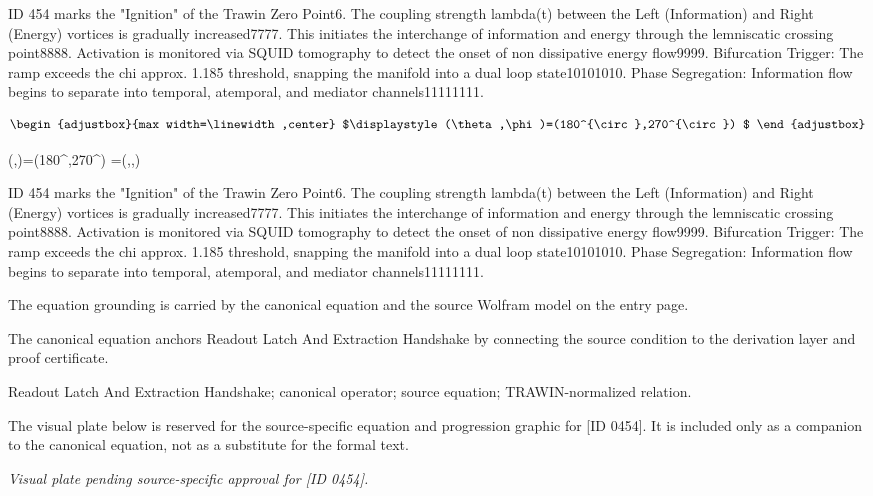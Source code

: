 ID 454 marks the "Ignition" of the Trawin Zero Point6. The coupling strength lambda(t) between the Left (Information) and Right (Energy) vortices is gradually increased7777. This initiates the interchange of information and energy through the lemniscatic crossing point8888. Activation is monitored via SQUID tomography to detect the onset of non dissipative energy flow9999. Bifurcation Trigger: The ramp exceeds the chi approx. 1.185 threshold, snapping the manifold into a dual loop state10101010. Phase Segregation: Information flow begins to separate into temporal, atemporal, and mediator channels11111111.

\[
\begin{adjustbox}{max width=\linewidth,center}
$\displaystyle
(\theta,\phi)=(180^{\circ},270^{\circ})
$
\end{adjustbox}
\]

\tzpequationlinks
  {(\theta,\phi)=(180^{\circ},270^{\circ})}
  {=\left(\sin\theta\cos\phi,\sin\theta\sin\phi,\cos\theta\right)}
  {\lVert{}}

ID 454 marks the "Ignition" of the Trawin Zero Point6. The coupling strength lambda(t) between the Left (Information) and Right (Energy) vortices is gradually increased7777. This initiates the interchange of information and energy through the lemniscatic crossing point8888. Activation is monitored via SQUID tomography to detect the onset of non dissipative energy flow9999. Bifurcation Trigger: The ramp exceeds the chi approx. 1.185 threshold, snapping the manifold into a dual loop state10101010. Phase Segregation: Information flow begins to separate into temporal, atemporal, and mediator channels11111111.

The equation grounding is carried by the canonical equation and the source Wolfram model on the entry page.

The canonical equation anchors Readout Latch And Extraction Handshake by connecting the source condition to the derivation layer and proof certificate.

Readout Latch And Extraction Handshake; canonical operator; source equation; TRAWIN-normalized relation.
\endgroup

\begingroup\footnotesize\sloppy
The visual plate below is reserved for the source-specific equation and progression graphic for [ID 0454]. It is included only as a companion to the canonical equation, not as a substitute for the formal text.
\par\endgroup
\begingroup\footnotesize\itshape
Visual plate pending source-specific approval for [ID 0454].
\par\endgroup

